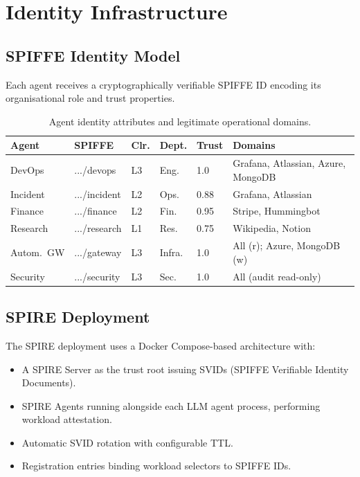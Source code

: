 \documentclass[10pt,a4paper,twocolumn]{article}
\begin{document}
\section{Identity Infrastructure}
\label{sec:identity}

\subsection{SPIFFE Identity Model}
\label{sec:spiffe}

Each agent receives a cryptographically verifiable SPIFFE ID encoding its organisational role and trust properties.

\begin{table}[!t]
\centering
\caption{Agent identity attributes and legitimate operational domains.}
\label{tab:identities}
\scriptsize
\setlength{\tabcolsep}{2pt}
\begin{tabular}{@{}lp{1.4cm}lllp{2.0cm}@{}}
\toprule
\textbf{Agent} & \textbf{SPIFFE} & \textbf{Clr.} & \textbf{Dept.} & \textbf{Trust} & \textbf{Domains} \\
\midrule
DevOps & \raggedright .../devops & L3 & Eng. & 1.0 & Grafana, Atlassian, Azure, MongoDB \\
Incident & \raggedright .../incident & L2 & Ops. & 0.88 & Grafana, Atlassian \\
Finance & \raggedright .../finance & L2 & Fin. & 0.95 & Stripe, Hummingbot \\
Research & \raggedright .../research & L1 & Res. & 0.75 & Wikipedia, Notion \\
Autom.\ GW & \raggedright .../gateway & L3 & Infra. & 1.0 & All (r); Azure, MongoDB (w) \\
Security & \raggedright .../security & L3 & Sec. & 1.0 & All (audit read-only) \\
\bottomrule
\end{tabular}
\end{table}

\subsection{SPIRE Deployment}
\label{sec:spire}

The SPIRE deployment uses a Docker Compose-based architecture with:
\begin{itemize}
  \item A SPIRE Server as the trust root issuing SVIDs (SPIFFE Verifiable Identity Documents).
  \item SPIRE Agents running alongside each LLM agent process, performing workload attestation.
  \item Automatic SVID rotation with configurable TTL.
  \item Registration entries binding workload selectors to SPIFFE IDs.
\end{itemize}
\end{document}
